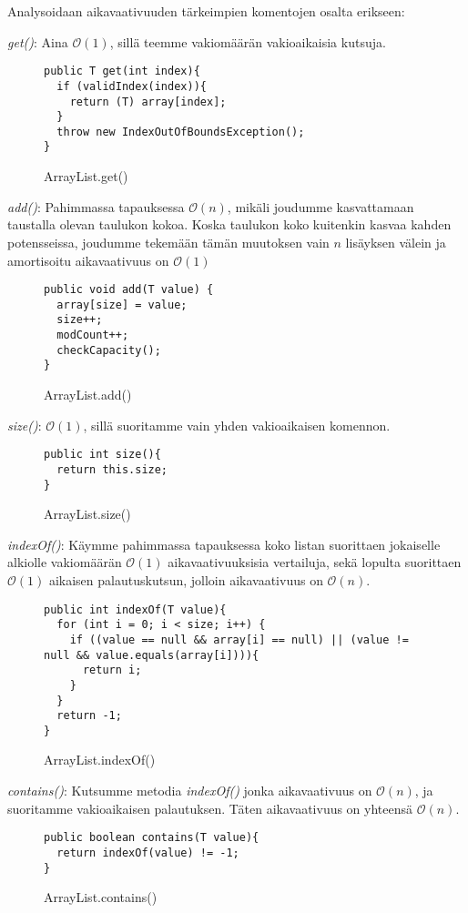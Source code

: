 \documentclass[12pt,a4paper]{article}
\begin{document}
Analysoidaan aikavaativuuden tärkeimpien komentojen osalta erikseen:

\textit{get()}: Aina $\mathcal{O}(1)$, sillä teemme vakiomäärän vakioaikaisia kutsuja.
\begin{figure}[H]
\begin{lstlisting}
public T get(int index){
  if (validIndex(index)){
    return (T) array[index];
  }
  throw new IndexOutOfBoundsException();
}
\end{lstlisting}
\caption{ArrayList.get()}
\end{figure}


\textit{add()}: Pahimmassa tapauksessa $\mathcal{O}(n)$, mikäli joudumme kasvattamaan taustalla olevan taulukon kokoa. Koska taulukon koko kuitenkin kasvaa kahden potensseissa, joudumme tekemään tämän muutoksen vain $n$ lisäyksen välein ja amortisoitu aikavaativuus on $\mathcal{O}(1)$
\begin{figure}[H]
\begin{lstlisting}
public void add(T value) {
  array[size] = value;
  size++;
  modCount++;
  checkCapacity();
}
\end{lstlisting}
\caption{ArrayList.add()}
\end{figure}

\textit{size()}: $\mathcal{O}(1)$, sillä suoritamme vain yhden vakioaikaisen komennon.
\begin{figure}[H]
\begin{lstlisting}
public int size(){
  return this.size;
}
\end{lstlisting}
\caption{ArrayList.size()}
\end{figure}

\textit{indexOf()}: Käymme pahimmassa tapauksessa koko listan suorittaen jokaiselle alkiolle vakiomäärän $\mathcal{O}(1)$ aikavaativuuksisia vertailuja, sekä lopulta suorittaen $\mathcal{O}(1)$ aikaisen palautuskutsun, jolloin aikavaativuus on $\mathcal{O}(n)$. 
\begin{figure}[H]
\begin{lstlisting}
public int indexOf(T value){
  for (int i = 0; i < size; i++) {
    if ((value == null && array[i] == null) || (value != null && value.equals(array[i]))){
      return i;
    }
  }
  return -1;
}
\end{lstlisting}
\caption{ArrayList.indexOf()}
\end{figure}

\textit{contains()}: Kutsumme metodia \textit{indexOf()} jonka aikavaativuus on $\mathcal{O}(n)$, ja suoritamme vakioaikaisen palautuksen. Täten aikavaativuus on yhteensä $\mathcal{O}(n)$.
\begin{figure}[H]
\begin{lstlisting}
public boolean contains(T value){
  return indexOf(value) != -1;
}
\end{lstlisting}
\caption{ArrayList.contains()}
\end{figure}
\end{document}
